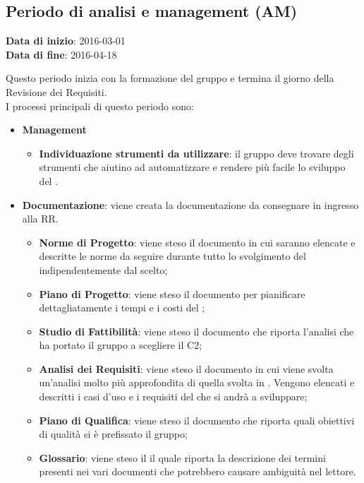 	\subsection{Periodo di analisi e management (AM)}
	\begin{center}
		\textbf{Data di inizio}: 2016-03-01 \\
		\textbf{Data di fine}: 2016-04-18 \\
	\end{center}

	Questo periodo inizia con la formazione del gruppo e termina il giorno della Revisione dei Requisiti. \\
	I processi principali di questo periodo sono: 
	\begin{itemize}
		\item \textbf{Management}
			\att
			\begin{itemize} 
				\item \textbf{Individuazione strumenti da utilizzare}: il gruppo deve trovare degli strumenti che aiutino ad automatizzare e rendere più facile lo sviluppo del .
			\end{itemize}
		\item \textbf{Documentazione}: viene creata la documentazione da consegnare in ingresso alla RR.
		\att
		\begin{itemize}
			\item \textbf{Norme di Progetto}: viene steso il documento \NPdocRR{} in cui saranno elencate e descritte le norme da seguire durante tutto lo svolgimento del  indipendentemente dal  scelto; 
			\item \textbf{Piano di Progetto}: viene steso il documento \PPdocRR{} per pianificare dettagliatamente i tempi e i costi del ;
			\item \textbf{Studio di Fattibilità}: viene steso il documento \SFdocRR{} che riporta l'analisi che ha portato il gruppo a scegliere il  C2;
			\item \textbf{Analisi dei Requisiti}: viene steso il documento \ARdocRR{} in cui viene svolta un'analisi molto più approfondita di quella svolta in \SFdocRR. Vengono elencati e descritti i casi d'uso e i requisiti del  che si andrà a sviluppare;
			\item \textbf{Piano di Qualifica}: viene steso il documento \PQdocRR{} che riporta quali obiettivi di qualità si è prefissato il gruppo;
			\item \textbf{Glossario}: viene steso il \GldocRR{} il quale riporta la descrizione dei termini presenti nei vari documenti che potrebbero causare ambiguità nel lettore.
		\end{itemize}
	\end{itemize}
	
